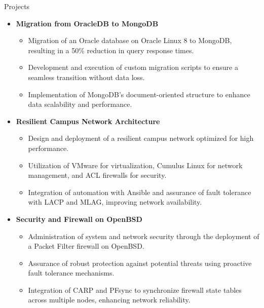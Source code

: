 \documentclass{resume}
\begin{document}
\begin{rSection}{Projects}
\begin{itemize}[leftmargin=*,label= ]
        \item \textbf{\large Migration from OracleDB to MongoDB} 
        \begin{itemize}
            \setlength{\itemsep}{-6pt} %
            \item Migration of an Oracle database on Oracle Linux 8 to MongoDB, resulting in a 50\% reduction in query response times.
            \item Development and execution of custom migration scripts to ensure a seamless transition without data loss.
            \item Implementation of MongoDB's document-oriented structure to enhance data scalability and performance.
        \end{itemize}
        
        \item \textbf{\large Resilient Campus Network Architecture}
        \begin{itemize}
            \setlength{\itemsep}{-6pt} %
            \item Design and deployment of a resilient campus network optimized for high performance.
            \item Utilization of VMware for virtualization, Cumulus Linux for network management, and ACL firewalls for security.
            \item Integration of automation with Ansible and assurance of fault tolerance with LACP and MLAG, improving network availability.
        \end{itemize}
        
        \item \textbf{\large Security and Firewall on OpenBSD}
        \begin{itemize}
            \setlength{\itemsep}{-6pt} %
            \item Administration of system and network security through the deployment of a Packet Filter firewall on OpenBSD.
            \item Assurance of robust protection against potential threats using proactive fault tolerance mechanisms.
            \item Integration of CARP and PFsync to synchronize firewall state tables across multiple nodes, enhancing network reliability.
        \end{itemize}
        

\end{itemize}
\end{rSection}
\end{document}

